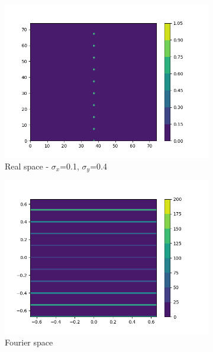 \documentclass{article}
\begin{document}
\begin{figure}[h]
\begin{subfigure}{0.45\textwidth}
                \centering
                \includegraphics[width=\textwidth]{real_2d_74_1column_highysig.png}
                \caption{Real space - $\sigma_x$=0.1, $\sigma_y$=0.4}\label{fig:real_2d_74_1column_highysig}
        \end{subfigure}
        \begin{subfigure}{0.45\textwidth}
                \centering
                \includegraphics[width=\textwidth]{fourier_2d_74_1column_highysig.png}
                \caption{Fourier space}\label{fig:fourier_2d_74_1column_highysig}
        \end{subfigure}
	\begin{subfigure}{0.45\textwidth}
                \centering

\end{subfigure}
\end{figure}
\end{document}
